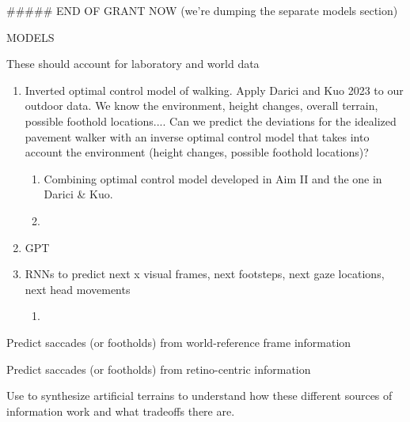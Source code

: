 \#\#\#\#\# END OF GRANT NOW (we're dumping the separate models section)

MODELS

These should account for laboratory and world data

\begin{enumerate}
\def\labelenumi{\Alph{enumi}.}
\item
  Inverted optimal control model of walking. Apply Darici and Kuo 2023
  to our outdoor data. We know the environment, height changes, overall
  terrain, possible foothold locations.... Can we predict the deviations
  for the idealized pavement walker with an inverse optimal control
  model that takes into account the environment (height changes,
  possible foothold locations)?

  \begin{enumerate}
  \def\labelenumii{\alph{enumii}.}
  \item
    Combining optimal control model developed in Aim II and the one in
    Darici \& Kuo.
  \item
  \end{enumerate}
\item
  GPT
\item
  RNNs to predict next x visual frames, next footsteps, next gaze
  locations, next head movements

  \begin{enumerate}
  \def\labelenumii{\alph{enumii}.}
  \tightlist
  \item
  \end{enumerate}
\end{enumerate}

Predict saccades (or footholds) from world-reference frame information

Predict saccades (or footholds) from retino-centric information

Use to synthesize artificial terrains to understand how these different
sources of information work and what tradeoffs there are.


